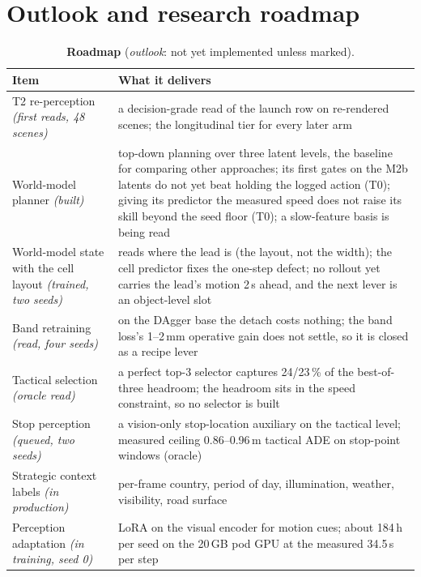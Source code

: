 \documentclass[10pt,twocolumn]{article}
\theoremstyle{remark}
\newcommand{\tier}[1]{\textsc{\small #1}}
\begin{document}
\section{Outlook and research roadmap}\label{sec:outlook}
\begin{table}[t]
\centering
\caption{\textbf{Roadmap} (\emph{outlook}: not yet implemented unless marked).}
\label{tab:roadmap}
\small
\begin{tabularx}{\columnwidth}{@{}>{\raggedright\arraybackslash}p{24mm}>{\raggedright\arraybackslash}X@{}}
\toprule
Item & What it delivers \\
\midrule
T2 re-perception \textit{(first reads, 48 scenes)} & a decision-grade read of the launch row on re-rendered scenes; the longitudinal tier for every later arm \\
World-model planner \textit{(built)} & top-down planning over three latent levels, the baseline for comparing other approaches; its first gates on the M2b latents do not yet beat holding the logged action (\tier{T0}); giving its predictor the measured speed does not raise its skill beyond the seed floor (\tier{T0}); a slow-feature basis is being read \\
World-model state with the cell layout \textit{(trained, two seeds)} & reads where the lead is (the layout, not the width); the cell predictor fixes the one-step defect; no rollout yet carries the lead's motion 2\,s ahead, and the next lever is an object-level slot \\
Band retraining \textit{(read, four seeds)} & on the DAgger base the detach costs nothing; the band loss's 1--2\,mm operative gain does not settle, so it is closed as a recipe lever \\
Tactical selection \textit{(oracle read)} & a perfect top-3 selector captures 24/23\,\% of the best-of-three headroom; the headroom sits in the speed constraint, so no selector is built \\
Stop perception \textit{(queued, two seeds)} & a vision-only stop-location auxiliary on the tactical level; measured ceiling 0.86--0.96\,m tactical ADE on stop-point windows (oracle) \\
Strategic context labels \textit{(in production)} & per-frame country, period of day, illumination, weather, visibility, road surface \\
Perception adaptation \textit{(in training, seed 0)} & LoRA on the visual encoder for motion cues; about 184\,h per seed on the 20\,GB pod GPU at the measured 34.5\,s per step \\

\end{tabularx}
\end{table}
\end{document}
